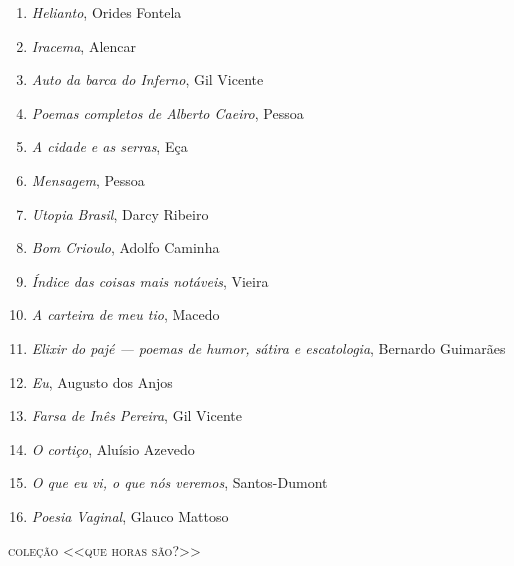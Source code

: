 \begin{enumerate}
\item \textit{Helianto}, Orides Fontela
\item \textit{Iracema}, Alencar
\item \textit{Auto da barca do Inferno}, Gil Vicente
\item \textit{Poemas completos de Alberto Caeiro}, Pessoa
\item \textit{A cidade e as serras}, Eça
\item \textit{Mensagem}, Pessoa
\item \textit{Utopia Brasil}, Darcy Ribeiro
\item \textit{Bom Crioulo}, Adolfo Caminha
\item \textit{Índice das coisas mais notáveis}, Vieira
\item \textit{A carteira de meu tio}, Macedo
\item \textit{Elixir do pajé --- poemas de humor, sátira e escatologia}, Bernardo Guimarães
\item \textit{Eu}, Augusto dos Anjos
\item \textit{Farsa de Inês Pereira}, Gil Vicente
\item \textit{O cortiço}, Aluísio Azevedo
\item \textit{O que eu vi, o que nós veremos}, Santos-Dumont
\item \textit{Poesia Vaginal}, Glauco Mattoso 
\end{enumerate}

\medskip
{\large\textsc{coleção <<que horas são?>>}}


